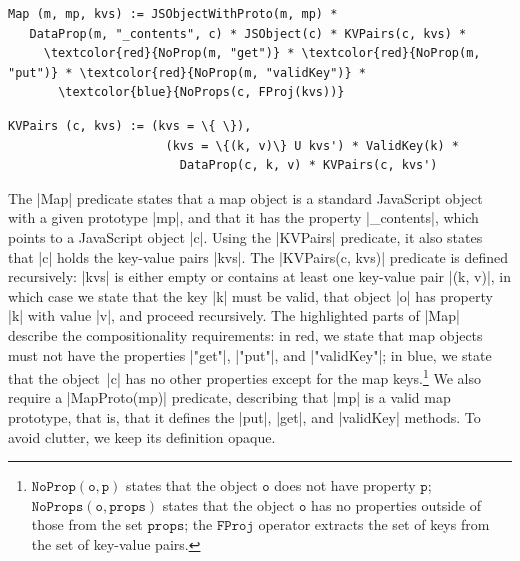 
\smallskip
\begin{Verbatim}[fontsize=\footnotesize,commandchars=\\\{\}]
 Map (m, mp, kvs) := JSObjectWithProto(m, mp) * 
   DataProp(m, "_contents", c) * JSObject(c) * KVPairs(c, kvs) * 
     \textcolor{red}{NoProp(m, "get")} * \textcolor{red}{NoProp(m, "put")} * \textcolor{red}{NoProp(m, "validKey")} * 
       \textcolor{blue}{NoProps(c, FProj(kvs))}
\end{Verbatim}
\begin{Verbatim}[fontsize=\footnotesize,commandchars=\\\{\}]
  KVPairs (c, kvs) := (kvs = \{ \}),
                      (kvs = \{(k, v)\} U kvs') * ValidKey(k) * 
                        DataProp(c, k, v) * KVPairs(c, kvs')
\end{Verbatim}

\smallskip
The \jsinline|Map| predicate states that a map object is a standard JavaScript object with a given prototype \jsinline|mp|, and that it has the property \jsinline|_contents|, which points to a  JavaScript object \jsinline|c|.
Using the \jsinline|KVPairs| predicate, %
it also states that \jsinline|c| holds the key-value pairs \jsinline|kvs|. 
The \jsinline|KVPairs(c, kvs)| predicate is defined recursively: \jsinline|kvs| is either empty or contains at least one key-value pair \jsinline|(k, v)|, 
in which case we state that the key \jsinline|k| must be valid, that object \jsinline|o| has  property \jsinline|k| with value \jsinline|v|, and proceed recursively.
The highlighted parts of \jsinline|Map| describe the compositionality requirements: in red, we state that map objects must not have the properties \jsinline|"get"|, \jsinline|"put"|, and \jsinline|"validKey"|; in blue, we state that the object~\jsinline|c| has no other properties except for the map keys.\footnote{$\mathtt{NoProp(o, p)}$  states that the object $\mathtt{o}$ does not have property $\mathtt{p}$; $\mathtt{NoProps(o, props)}$ states that the object $\mathtt{o}$ has no properties outside of those from the set $\mathtt{props}$; the $\mathtt{FProj}$ operator extracts the set of keys from the set of key-value pairs.}
%
We also require a \jsinline|MapProto(mp)| predicate, describing that \jsinline|mp| is a valid map prototype, that is, that it defines the \jsinline|put|, \jsinline|get|, and \jsinline|validKey| methods. To avoid clutter, we keep its definition opaque.

